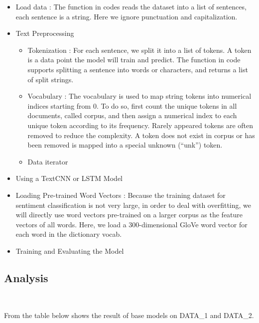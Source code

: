 \begin{itemize}
	
	\item 
	Load data : The function in codes 
	reads the dataset into a list of sentences, 
	each sentence is a string. 
	Here we ignore punctuation and capitalization.
	\item 
	Text Preprocessing
	
	\begin{itemize}
		\item 
		Tokenization : For each sentence, 
		we split it into a list of tokens. 
		A token is a data point the model will train and predict. 
		The function in code supports 
		splitting a sentence into words or characters, 
		and returns a list of split strings.
		\item 
		Vocabulary : The vocabulary is used to 
		map string tokens into numerical indices starting from 0. 
		To do so, 
		first count the unique tokens in all documents, 
		called corpus, 
		and then assign a numerical index to 
		each unique token according to its frequency. 
		Rarely appeared tokens are 
		often removed to reduce the complexity. 
		A token does not exist in corpus or 
		has been removed is mapped into 
		a special unknown (“unk”) token. 
		\item 
		Data iterator
	\end{itemize}
	
	\item 
	Using a TextCNN or LSTM Model
	
	\item 
	Loading Pre-trained Word Vectors :
	Because the training dataset for 
	sentiment classification is not very large, 
	in order to deal with overfitting, 
	we will directly use word vectors pre-trained on 
	a larger corpus as the feature vectors of all words. 
	Here, we load a 300-dimensional GloVe word vector
	 for each word in the dictionary vocab.
	
	\item 
	Training and Evaluating the Model
	
\end{itemize}

\subsection{Analysis}
\

From the table below
shows the result of base models
on DATA\_1 and DATA\_2.

